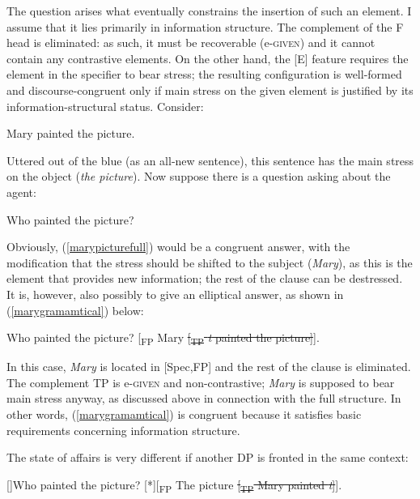 The question arises what eventually constrains the insertion of such an element. I assume that it lies primarily in information structure. The complement of the F head is eliminated: as such, it must be recoverable (e-\textsc{given}) and it cannot contain any contrastive elements. On the other hand, the [E] feature requires the element in the specifier to bear stress; the resulting configuration is well-formed and discourse-congruent only if main stress on the given element is justified by its information-structural status. Consider:

\ea Mary painted the picture. \label{marypicturefull}
\z

Uttered out of the blue (as an all-new sentence), this sentence has the main stress on the object (\textit{the picture}). Now suppose there is a question asking about the agent:

\ea Who painted the picture?
\z

Obviously, (\ref{marypicturefull}) would be a congruent answer, with the modification that the stress should be shifted to the subject (\textit{Mary}), as this is the element that provides new information; the rest of the clause can be destressed. It is, however, also possibly to give an elliptical answer, as shown in (\ref{marygramamtical}) below:

\begin{exe}
\ex \label{marygramamtical}
\begin{xlist} 
 Who painted the picture?
 {[}\textsubscript{FP} Mary \sout{[\textsubscript{TP} \textit{t} painted the picture]}].
\end{xlist}
\end{exe}

In this case, \textit{Mary} is located in [Spec,FP] and the rest of the clause is eliminated. The complement TP is e-\textsc{given} and non-contrastive; \textit{Mary} is supposed to bear main stress anyway, as discussed above in connection with the full structure. In other words, (\ref{marygramamtical}) is congruent because it satisfies basic requirements concerning information structure.

The state of affairs is very different if another DP is fronted in the same context:

\begin{exe}
\ex \label{maryungramamtical}
\begin{xlist} 
[]{Who painted the picture?}
[*]{{[}\textsubscript{FP} The picture \sout{[\textsubscript{TP} Mary painted \textit{t}]}].}
\end{xlist}
\end{exe}

